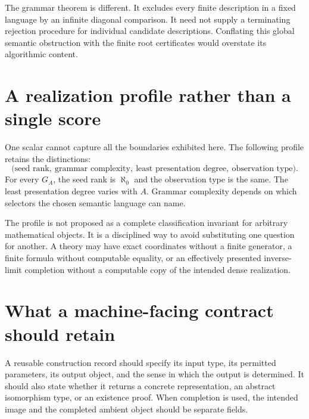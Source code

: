The grammar theorem is different. It excludes every finite description in a fixed language by an infinite diagonal comparison. It need not supply a terminating rejection procedure for individual candidate descriptions. Conflating this global semantic obstruction with the finite root certificates would overstate its algorithmic content.

\section{A realization profile rather than a single score}
One scalar cannot capture all the boundaries exhibited here. The following profile retains the distinctions:
\[
\bigl(\text{seed rank},\ \text{grammar complexity},\
\text{least presentation degree},\ \text{observation type}\bigr).
\]
For every $G_A$, the seed rank is $\aleph_0$ and the observation type is the same. The least presentation degree varies with $A$. Grammar complexity depends on which selectors the chosen semantic language can name.

The profile is not proposed as a complete classification invariant for arbitrary mathematical objects. It is a disciplined way to avoid substituting one question for another. A theory may have exact coordinates without a finite generator, a finite formula without computable equality, or an effectively presented inverse-limit completion without a computable copy of the intended dense realization.

\section{What a machine-facing contract should retain}
A reusable construction record should specify its input type, its permitted parameters, its output object, and the sense in which the output is determined. It should also state whether it returns a concrete representation, an abstract isomorphism type, or an existence proof. When completion is used, the intended image and the completed ambient object should be separate fields.

